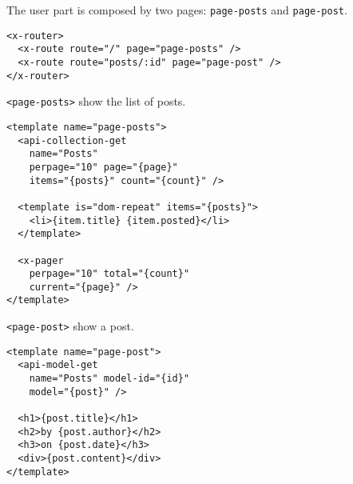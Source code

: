 The user part is composed by two pages: \texttt{page-posts} and \texttt{page-post}.

\begin{lstlisting}[language=HTML5]
<x-router>
  <x-route route="/" page="page-posts" />
  <x-route route="posts/:id" page="page-post" />
</x-router>
\end{lstlisting}

\texttt{<page-posts>} show the list of posts.

\begin{lstlisting}[language=HTML5]
<template name="page-posts">
  <api-collection-get 
    name="Posts"
    perpage="10" page="{page}" 
    items="{posts}" count="{count}" />

  <template is="dom-repeat" items="{posts}">
    <li>{item.title} {item.posted}</li>
  </template>

  <x-pager 
    perpage="10" total="{count}" 
    current="{page}" />
</template>
\end{lstlisting}

\texttt{<page-post>} show a post. 

\begin{lstlisting}[language=HTML5]
<template name="page-post">
  <api-model-get 
    name="Posts" model-id="{id}" 
    model="{post}" />

  <h1>{post.title}</h1>
  <h2>by {post.author}</h2>
  <h3>on {post.date}</h3>
  <div>{post.content}</div>
</template>
\end{lstlisting}

